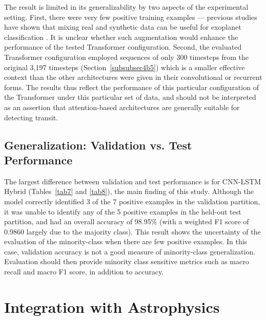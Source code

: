 \documentclass[preprint,11pt,times]{elsarticle}
\begin{document}
The result is limited in its generalizability by two aspects of the experimental setting. First, there were very few positive training examples — previous studies have shown that mixing real and synthetic data can be useful for exoplanet classification \cite{bib7}. It is unclear whether such augmentation would enhance the performance of the tested Transformer configuration. Second, the evaluated Transformer configuration employed sequences of only 300 timesteps from the original 3,197 timesteps (Section~\ref{subsubsec4b5}) which is a smaller effective context than the other architectures were given in their convolutional or recurrent forms. The results thus reflect the performance of this particular configuration of the Transformer under this particular set of data, and should not be interpreted as an assertion that attention-based architectures are generally suitable for detecting transit.

\subsection{Generalization: Validation vs. Test Performance}\label{subsec7e}

The largest difference between validation and test performance is for CNN-LSTM Hybrid (Tables~\ref{tab7} and \ref{tab8}), the main finding of this study. Although the model correctly identified 3 of the 7 positive examples in the validation partition, it was unable to identify any of the 5 positive examples in the held-out test partition, and had an overall accuracy of 98.95\% (with a weighted F1 score of 0.9860 largely due to the majority class). This result shows the uncertainty of the evaluation of the minority-class when there are few positive examples. In this case, validation accuracy is not a good measure of minority-class generalization. Evaluation should then provide minority class sensitive metrics such as macro recall and macro F1 score, in addition to accuracy.

\section{Integration with Astrophysics}\label{sec8}
\end{document}
